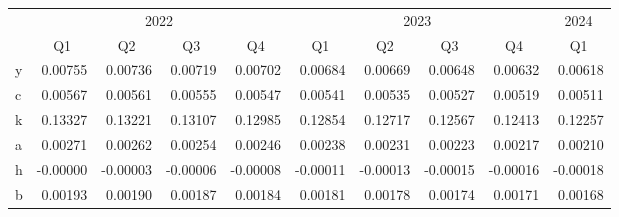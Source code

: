 \setlength{\parindent}{6pt}
\setlength{\tabcolsep}{4pt}
\begin{tabular}{@{}lrrrrrrrrr@{}}%
\toprule%
 & \multicolumn{4}{c}{2022} & \multicolumn{4}{c}{2023} & \multicolumn{1}{c}{2024}\\
 & \multicolumn{1}{c}{Q1} & \multicolumn{1}{c}{Q2} & \multicolumn{1}{c}{Q3} & \multicolumn{1}{c}{Q4} & \multicolumn{1}{c}{Q1} & \multicolumn{1}{c}{Q2} & \multicolumn{1}{c}{Q3} & \multicolumn{1}{c}{Q4} & \multicolumn{1}{c}{Q1}\\[-2pt]%
\hline%
%
\rowcolor{white}\noindent y&0.00755&0.00736&0.00719&0.00702&0.00684&0.00669&0.00648&0.00632&0.00618\\%
\rowcolor{white}\noindent c&0.00567&0.00561&0.00555&0.00547&0.00541&0.00535&0.00527&0.00519&0.00511\\%
\rowcolor{white}\noindent k&0.13327&0.13221&0.13107&0.12985&0.12854&0.12717&0.12567&0.12413&0.12257\\%
\rowcolor{white}\noindent a&0.00271&0.00262&0.00254&0.00246&0.00238&0.00231&0.00223&0.00217&0.00210\\%
\rowcolor{white}\noindent h&-0.00000&-0.00003&-0.00006&-0.00008&-0.00011&-0.00013&-0.00015&-0.00016&-0.00018\\%
\rowcolor{white}\noindent b&0.00193&0.00190&0.00187&0.00184&0.00181&0.00178&0.00174&0.00171&0.00168\\%
\bottomrule
\end{tabular}\setlength{\parindent}{0pt}
 \par \medskip

